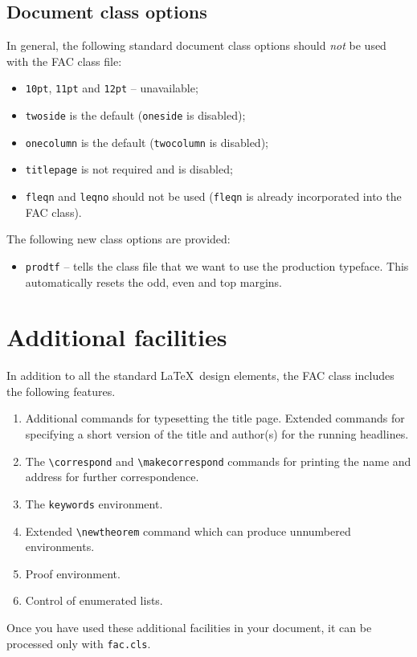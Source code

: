 \documentclass{fac}
\begin{document}
\subsection{Document class options}\label{sec:ClassOp}

In general, the following standard document class options should \emph{not} be
used with the FAC class file:
%
\begin{itemize}
  \item \texttt{10pt}, \texttt{11pt} and \texttt{12pt} -- unavailable;
  \item \texttt{twoside} is the default (\texttt{oneside} is disabled);
  \item \texttt{onecolumn} is the default (\texttt{twocolumn} is disabled);
  \item \texttt{titlepage} is not required and is disabled;
  \item \texttt{fleqn} and \texttt{leqno} should not be used
        (\verb"fleqn" is already incorporated into the FAC class).
\end{itemize}
%
\ifprodtf
The following new class options are provided:
\begin{itemize}
  \item \texttt{prodtf} -- tells the class file that we want to use the
    production typeface. This automatically resets the odd, even and top
    margins.
\end{itemize}
\fi

\section{Additional facilities}

In addition to all the standard \LaTeX\ design elements, the FAC class
includes the following features.
%
\begin{enumerate}
  \item Additional commands for typesetting the title page. Extended
        commands for specifying a short version of the title and author(s)
        for the running headlines.
  \item The \verb"\correspond" and \verb"\makecorrespond" commands for printing
        the name and address for further correspondence.
  \item The \verb"keywords" environment.
  \item Extended \verb"\newtheorem" command which can produce
        unnumbered environments.
  \item Proof environment.
  \item Control of enumerated lists.
\end{enumerate}
%
Once you have used these additional facilities in your document,
it can be processed only with \verb"fac.cls".
\end{document}
